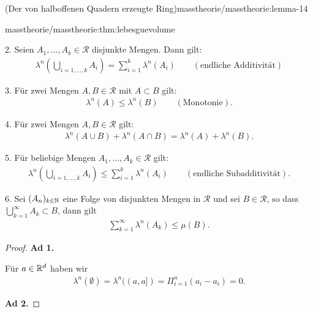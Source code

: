 \begin{lemma}{(Der von halboffenen Quadern erzeugte Ring)}{masstheorie/masstheorie:lemma-14}
\begin{theorem}{}{masstheorie/masstheorie:thm:lebesguevolume}
\par
2. Seien \(A_1, \ldots, A_k \in \mathcal{R}\) disjunkte Mengen.
Dann gilt:
\begin{align*}
\lambda^n \left( \bigcup_{i=1,\ldots,k} A_i \right) = \sum_{i=1}^k \lambda^n(A_i) \qquad (\text{endliche Additivität})
\end{align*}
\par
3. Für zwei Mengen \(A, B \in \mathcal{R}\) mit \(A \subset B\) gilt:
\begin{align*}
\lambda^n(A) \leq \lambda^n(B) \qquad (\text{Monotonie}).
\end{align*}
\par
4. Für zwei Mengen \(A, B \in \mathcal{R}\) gilt:
\begin{align*}
\lambda^n(A \cup B) + \lambda^n(A \cap B) = \lambda^n(A) + \lambda^n(B).
\end{align*}
\par
5. Für beliebige Mengen \(A_1, \ldots, A_k \in \mathcal{R}\) gilt:
\begin{align*}
\lambda^n\left( \bigcup_{i=1,\ldots,k} A_i\right) \leq \sum_{i=1}^k \lambda^n(A_i) \qquad (\text{endliche Subadditivität}).
\end{align*}
\par
6. Sei \((A_n)_{k\in\mathbb{N}}\) eine Folge von disjunkten Mengen in \(\mathcal{R}\) und sei \(B \in \mathcal{R}\), so dass \(\bigcup_{k=1}^\infty A_k \subset B\), dann gilt
\begin{align*}
\sum_{k=1}^\infty  \lambda^n(A_k) \leq \mu(B).
\end{align*}\end{theorem}

\begin{proof}
 \textbf{Ad 1.}

\par
Für \(a\in\mathbb{R}^d\) haben wir
\begin{align*}
\lambda^n(\emptyset) = \lambda^n((a,a]) = \Pi_{i=1}^n (a_i - a_i) = 0.
\end{align*}
\par
\textbf{Ad 2.}


\end{proof}
\end{lemma}
